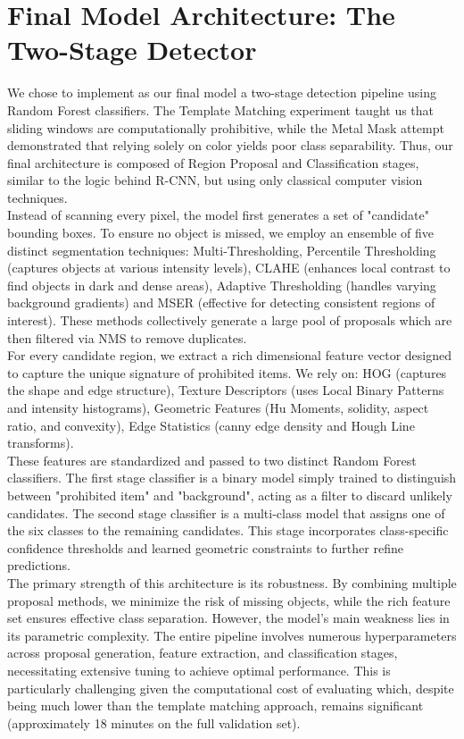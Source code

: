 \documentclass[10pt,a4paper]{article}
\begin{document}
\section{Final Model Architecture: The Two-Stage Detector}

We chose to implement as our final model a two-stage detection pipeline using Random Forest classifiers. The Template Matching experiment taught us that sliding windows are computationally prohibitive, while the Metal Mask attempt demonstrated that relying solely on color yields poor class separability. Thus, our final architecture is composed of Region Proposal and Classification stages, similar to the logic behind R-CNN, but using only classical computer vision techniques. \\
Instead of scanning every pixel, the model first generates a set of "candidate" bounding boxes. To ensure no object is missed, we employ an ensemble of five distinct segmentation techniques: Multi-Thresholding, Percentile Thresholding (captures objects at various intensity levels), CLAHE (enhances local contrast to find objects in dark and dense areas), Adaptive Thresholding (handles varying background gradients) and MSER (effective for detecting consistent regions of interest). These methods collectively generate a large pool of proposals which are then filtered via NMS to remove duplicates. \\
For every candidate region, we extract a rich dimensional feature vector designed to capture the unique signature of prohibited items. We rely on: HOG (captures the shape and edge structure), Texture Descriptors (uses Local Binary Patterns and intensity histograms), Geometric Features (Hu Moments, solidity, aspect ratio, and convexity), Edge Statistics (canny edge density and Hough Line transforms). \\
These features are standardized and passed to two distinct Random Forest classifiers. The first stage classifier is a binary model simply trained to distinguish between "prohibited item" and "background", acting as a filter to discard unlikely candidates. The second stage classifier is a multi-class model that assigns one of the six classes to the remaining candidates. This stage incorporates class-specific confidence thresholds and learned geometric constraints to further refine predictions. \\
The primary strength of this architecture is its robustness. By combining multiple proposal methods, we minimize the risk of missing objects, while the rich feature set ensures effective class separation. However, the model's main weakness lies in its parametric complexity. The entire pipeline involves numerous hyperparameters across proposal generation, feature extraction, and classification stages, necessitating extensive tuning to achieve optimal performance. This is particularly challenging given the computational cost of evaluating which, despite being much lower than the template matching approach, remains significant (approximately 18 minutes on the full validation set).
 
\end{document}
